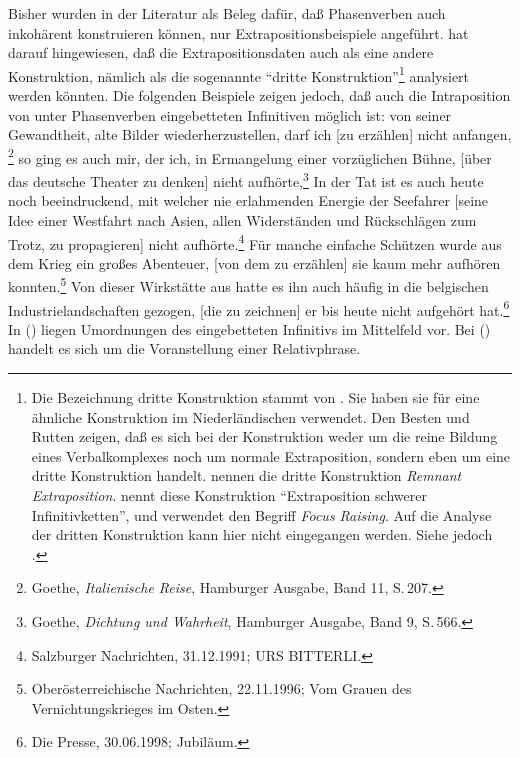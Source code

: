 \noindent
Bisher wurden in der Literatur als Beleg dafür, daß Phasenverben auch inkohärent konstruieren können,
nur Extrapositionsbeispiele angeführt. \citet{Reis2005a} hat darauf hingewiesen, daß
die Extrapositionsdaten auch als eine andere Konstruktion, nämlich als die sogenannte
"`dritte Konstruktion"'\footnote{
	Die Bezeichnung dritte Konstruktion stammt von \citet*{dBR89}.%
	Sie haben sie für eine ähnliche Konstruktion im 
	Niederländischen verwendet. 
	Den Besten und Rutten zeigen, daß es sich bei der Konstruktion weder 
	um die reine Bildung eines Verbalkomplexes noch um normale Extraposition,
	sondern eben um eine dritte Konstruktion handelt. \citet*{BBHR95}
        nennen die dritte Konstruktion \textit{Remnant Extraposition\/}.
%
        \citet*[]{Wunderlich80} nennt diese Konstruktion "`Extraposition schwerer Infinitivketten"', und
	\citet*[]{Uszkoreit87a} verwendet den Begriff \textit{Focus Raising\/}.
        Auf die Analyse der dritten Konstruktion kann hier nicht eingegangen werden.
        Siehe jedoch .%
} analysiert werden könnten. Die folgenden Beispiele zeigen jedoch,
daß auch die Intraposition von unter Phasenverben eingebetteten Infinitiven möglich ist:
\eal
\ex von seiner Gewandtheit, alte Bilder wiederherzustellen,  darf ich [zu erzählen] nicht anfangen,%
\footnote{
 Goethe, \emph{Italienische Reise}, Hamburger Ausgabe, Band 11, S.\,207.
}
\ex so ging es auch mir, der ich, in Ermangelung einer vorzüglichen Bühne, [über das deutsche Theater zu denken] nicht aufhörte,\footnote{
  Goethe, \emph{Dichtung und Wahrheit}, Hamburger Ausgabe, Band 9, S.\,566.
}
\ex\label{bsp-seefahrer} 
In der Tat ist es auch heute noch beeindruckend, 
    mit welcher nie erlahmenden Energie der Seefahrer 
    [seine Idee einer Westfahrt nach Asien, allen Widerständen und Rückschlägen zum Trotz, 
    zu propagieren] nicht aufhörte.\footnote{
      Salzburger Nachrichten, 31.12.1991; URS BITTERLI.%
    }
\zl
\eal
\ex Für manche einfache Schützen wurde aus dem Krieg ein großes Abenteuer, [von dem zu erzählen] 
    sie kaum mehr aufhören konnten.\footnote{
  Oberösterreichische Nachrichten, 22.11.1996; Vom Grauen des Vernichtungskrieges im Osten.%
}
\ex Von dieser Wirkstätte aus hatte es ihn auch häufig in die belgischen Industrielandschaften gezogen, [die zu zeichnen] er bis heute nicht aufgehört hat.\footnote{
  Die Presse, 30.06.1998; Jubiläum.%
}
\zl
In () liegen Umordnungen des eingebetteten Infinitivs im Mittelfeld vor. Bei () handelt
es sich um die Voranstellung einer Relativphrase.

